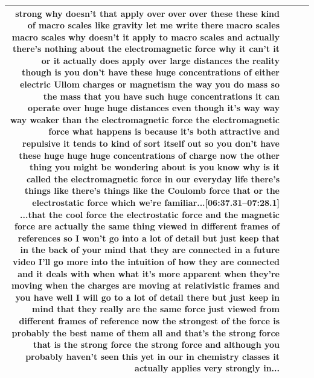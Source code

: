 \documentclass[10pt]{article}
\begin{document}
\begin{tiny}
\begin{longtable}{|r|p{0.375in}|p{1.275in}|p{3.5in}|}
strong why doesn't that apply over over over these these kind of macro scales like gravity let me write there macro scales macro scales why doesn't it apply to macro scales and actually there's nothing about the electromagnetic force why it can't it or it actually does apply over large distances the reality though is you don't have these huge concentrations of either electric Ullom charges or magnetism the way you do mass so the mass that you have such huge concentrations it can operate over huge huge distances even though it's way way way weaker than the electromagnetic force the electromagnetic force what happens is because it's both attractive and repulsive it tends to kind of sort itself out so you don't have these huge huge huge concentrations of charge now the other thing you might be wondering about is you know why is it called the electromagnetic force in our everyday life there's things like there's things like the Coulomb force that or the electrostatic force which we're familiar...\newline\textbf{[06:37.31--07:28.1]} ...that the cool force the electrostatic force and the magnetic force are actually the same thing viewed in different frames of references so I won't go into a lot of detail but just keep that in the back of your mind that they are connected in a future video I'll go more into the intuition of how they are connected and it deals with when what it's more apparent when they're moving when the charges are moving at relativistic frames and you have well I will go to a lot of detail there but just keep in mind that they really are the same force just viewed from different frames of reference now the strongest of the force is probably the best name of them all and that's the strong force that is the strong force the strong force and although you probably haven't seen this yet in our in chemistry classes it actually applies very strongly in... \\\hline

\end{longtable}
\end{tiny}
\end{document}
